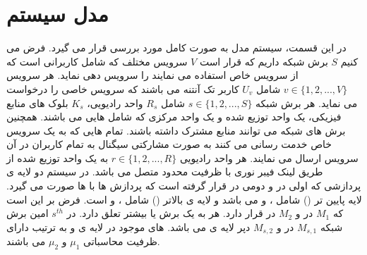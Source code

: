 \section{مدل سیستم}
در این قسمت، سیستم مدل به صورت کامل مورد بررسی قرار می گیرد.
فرض می کنیم $S$ برش شبکه داریم که قرار است $V$ سرویس مختلف که شامل کاربرانی است که از سرویس خاص استفاده می نمایند را سرویس دهی نماید.
هر سرویس 
$v\in \{1,2,...,V \} $
شامل 
$U_v$
کاربر تک آنتنه می باشند که سرویس خاصی را درخواست می نماید.
هر برش شبکه 
$s \in \{1,2,...,S \}$
شامل 
$R_s$
واحد رادیویی،
$K_s$
بلوک های منابع فیزیکی، یک واحد توزیع شده و یک واحد مرکزی که شامل  هایی می باشند.
همچنین برش های شبکه می توانند منابع مشترک داشته باشند.
تمام هایی که به یک سرویس خاص خدمت رسانی می کنند به صورت مشارکتی سیگنال به تمام کاربران در آن سرویس ارسال می نمایند. 
\cite{motalleb2017optimal,mimoCran}
هر واحد رادیویی
$r \in \{1,2,...,R \}$
به یک واحد توزیع شده از طریق لینک فیبر نوری با ظرفیت  
محدود متصل می باشد.
در سیستم 
دو لایه ی پردازشی که اولی در  و دومی در  قرار گرفته است که پردازش ها با  ها صورت می گیرد.
لایه پایین تر () شامل 
،
و 
می باشد و 
لایه ی بالاتر 
()
شامل 
،
و 
است.
فرض بر این است که $M_1$
در 
و 
$M_2$
در  قرار دارد.
هر  به یک برش یا بیشتر تعلق دارد.
در $s^{th}$ امین برش شبکه $M_{s,1}$ 
در 
و 
$M_{s,2}$
دپر لایه ی  می باشد.
های موجود در لایه ی  و  به ترتیب دارای ظرفیت محاسباتی 
$\mu_1$ 
و
 $\mu_2$
می باشند.
